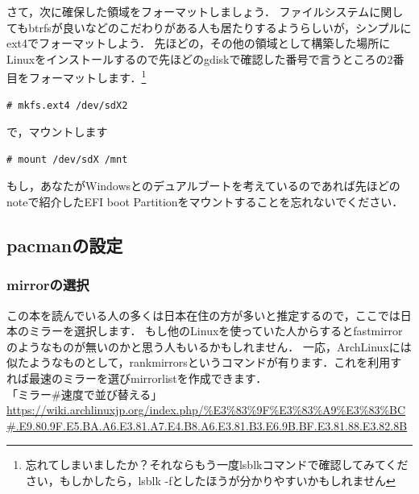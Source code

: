 \documentclass[b5j,twoside,openany]{jsbook}
\begin{document}
      \newpage

      さて，次に確保した領域をフォーマットしましょう．
      ファイルシステムに関してもbtrfsが良いなどのこだわりがある人も居たりするようらしいが，シンプルにext4でフォーマットしよう．
      先ほどの，その他の領域として構築した場所にLinuxをインストールするので先ほどのgdiskで確認した番号で言うところの2番目をフォーマットします．\footnote{忘れてしまいましたか？それならもう一度lsblkコマンドで確認してみてください，もしかしたら，lsblk -fとしたほうが分かりやすいかもしれません}
      \begin{screen}
\begin{verbatim}
# mkfs.ext4 /dev/sdX2
\end{verbatim}
      \end{screen}
      
      で，マウントします
      \begin{screen}
\begin{verbatim}
# mount /dev/sdX /mnt
\end{verbatim}
      \end{screen}
      
      \begin{boxnote}
        もし，あなたがWindowsとのデュアルブートを考えているのであれば先ほどのnoteで紹介したEFI boot Partitionをマウントすることを忘れないでください．
      \end{boxnote}

    \newpage

    \subsection{pacmanの設定}
      \subsubsection{mirrorの選択}
        この本を読んでいる人の多くは日本在住の方が多いと推定するので，ここでは日本のミラーを選択します．
        もし他のLinuxを使っていた人からするとfastmirrorのようなものが無いのかと思う人もいるかもしれません．
        一応，ArchLinuxには似たようなものとして，rankmirrorsというコマンドが有ります．これを利用すれば最速のミラーを選びmirrorlistを作成できます．\\

        「ミラー\#速度で並び替える」\\
        \url{https://wiki.archlinuxjp.org/index.php/%E3%83%9F%E3%83%A9%E3%83%BC#.E9.80.9F.E5.BA.A6.E3.81.A7.E4.B8.A6.E3.81.B3.E6.9B.BF.E3.81.88.E3.82.8B}\\
\end{document}
